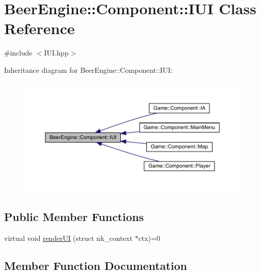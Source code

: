 \hypertarget{class_beer_engine_1_1_component_1_1_i_u_i}{}\section{Beer\+Engine\+:\+:Component\+:\+:I\+UI Class Reference}
\label{class_beer_engine_1_1_component_1_1_i_u_i}


{\ttfamily \#include $<$I\+U\+I.\+hpp$>$}



Inheritance diagram for Beer\+Engine\+:\+:Component\+:\+:I\+UI\+:
\nopagebreak
\begin{figure}[H]
\begin{center}
\leavevmode
\includegraphics[width=350pt]{class_beer_engine_1_1_component_1_1_i_u_i__inherit__graph}
\end{center}
\end{figure}
\subsection*{Public Member Functions}
\begin{DoxyCompactItemize}
\item 
virtual void \mbox{\hyperlink{class_beer_engine_1_1_component_1_1_i_u_i_a4a049b1749c1bce80e1fd63538e9fae3}{render\+UI}} (struct nk\+\_\+context $\ast$ctx)=0
\end{DoxyCompactItemize}


\subsection{Member Function Documentation}
\mbox{\label{class_beer_engine_1_1_component_1_1_i_u_i_a4a049b1749c1bce80e1fd63538e9fae3}} 
